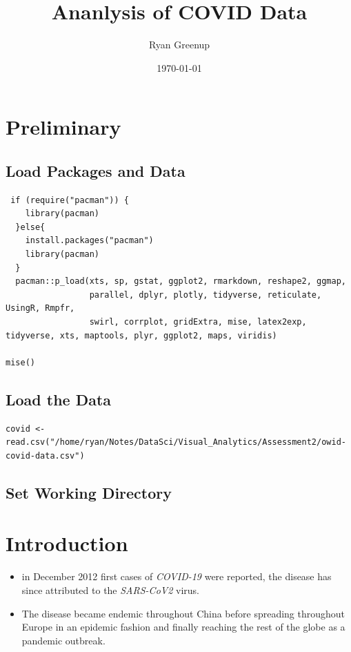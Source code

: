 \documentclass[11pt]{article}
\author{Ryan Greenup}
\date{\today}
\title{Ananlysis of COVID Data}
\begin{document}
\maketitle
\tableofcontents


\section{Preliminary}
\label{sec:orga05d9d0}
\subsection{Load Packages and Data}
\label{sec:org52451a6}

\begin{verbatim}
 if (require("pacman")) {
    library(pacman)
  }else{
    install.packages("pacman")
    library(pacman)
  }
  pacman::p_load(xts, sp, gstat, ggplot2, rmarkdown, reshape2, ggmap,
                 parallel, dplyr, plotly, tidyverse, reticulate, UsingR, Rmpfr,
                 swirl, corrplot, gridExtra, mise, latex2exp, tidyverse, xts, maptools, plyr, ggplot2, maps, viridis)

mise()

\end{verbatim}

\subsection{Load the Data}
\label{sec:org1cf5590}
\begin{verbatim}
covid <- read.csv("/home/ryan/Notes/DataSci/Visual_Analytics/Assessment2/owid-covid-data.csv")

\end{verbatim}

\subsection{Set Working Directory}
\label{sec:orgab0a512}

\section{Introduction}
\label{sec:orga58e60f}
\begin{itemize}
\item in December 2012 first cases of \emph{COVID-19} were reported, the disease has
since attributed to the \emph{SARS-CoV2} virus.
\item The disease became endemic throughout China before spreading throughout Europe
in an epidemic fashion and finally reaching the rest of the globe as a
pandemic outbreak.
\end{itemize}
\end{document}
